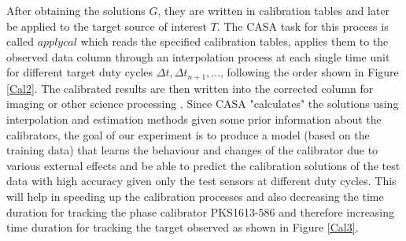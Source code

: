 %
 
After obtaining the solutions $G$, they are written in calibration tables and later be applied to the target source of interest $T$. The CASA task for this process is called $\textit{applycal}$ which reads the specified calibration tables, applies them to the observed data column through an interpolation process at each single time unit for different target duty cycles $\Delta t, \Delta t_{n+1},\dots$, following the order shown in Figure \ref{Cal2}. The calibrated results are then written into the corrected column for imaging or other science processing \citep{ott2013casa}. Since CASA "calculates" the solutions using interpolation and estimation methods given some prior information about the calibrators, the goal of our experiment is to produce a model (based on the training data) that learns the behaviour and changes of the calibrator due to various external effects and be able to predict the calibration solutions of the test data with high accuracy given only the test sensors at different duty cycles. This will help in speeding up the calibration processes and also decreasing the time duration for tracking the phase calibrator PKS1613-586 and therefore increasing time duration for tracking the target observed as shown in Figure \ref{Cal3}. 

